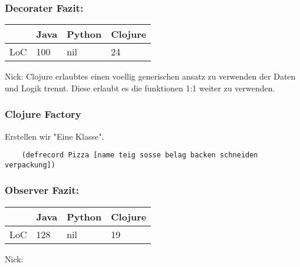 \documentclass[compress, blue]{beamer}
\begin{document}



\begin{frame}\frametitle{Decorater Fazit:}
    \begin{tabular}{l | l l l}
     & Java &  Python & Clojure  \\
     \hline
    LoC & 100 &  nil & 24  \\
  \end{tabular}
  \begin{block}{Nick: }
    Clojure erlaubtes einen voellig generischen ansatz zu verwenden der
    Daten und Logik trennt. Diese erlaubt es die funktionen 1:1 weiter
    zu verwenden.
  \end{block}
\end{frame}


\begin{frame}[fragile]\frametitle{Clojure Factory}

  Erstellen wir "Eine Klasse".
  \begin{lstlisting}
    (defrecord Pizza [name teig sosse belag backen schneiden verpackung])
  \end{lstlisting}
\pause


\end{frame}






\begin{frame}\frametitle{Observer Fazit:}
    \begin{tabular}{l | l l l}
     & Java &  Python & Clojure  \\
     \hline
    LoC & 128 &  nil & 19  \\
  \end{tabular}
  
  \begin{block}{Nick:}

  \end{block}
\end{frame}

\end{document}
